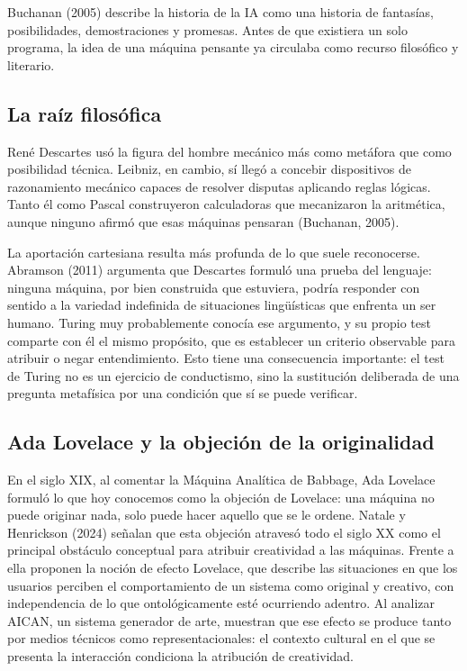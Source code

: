 \documentclass[12pt,letterpaper,oneside]{article}
\begin{document}
Buchanan (2005) describe la historia de la IA como una historia de fantasías, posibilidades, demostraciones y promesas. Antes de que existiera un solo programa, la idea de una máquina pensante ya circulaba como recurso filosófico y literario.

\subsection{La raíz filosófica}

René Descartes usó la figura del hombre mecánico más como metáfora que como posibilidad técnica. Leibniz, en cambio, sí llegó a concebir dispositivos de razonamiento mecánico capaces de resolver disputas aplicando reglas lógicas. Tanto él como Pascal construyeron calculadoras que mecanizaron la aritmética, aunque ninguno afirmó que esas máquinas pensaran (Buchanan, 2005).

La aportación cartesiana resulta más profunda de lo que suele reconocerse. Abramson (2011) argumenta que Descartes formuló una prueba del lenguaje: ninguna máquina, por bien construida que estuviera, podría responder con sentido a la variedad indefinida de situaciones lingüísticas que enfrenta un ser humano. Turing muy probablemente conocía ese argumento, y su propio test comparte con él el mismo propósito, que es establecer un criterio observable para atribuir o negar entendimiento. Esto tiene una consecuencia importante: el test de Turing no es un ejercicio de conductismo, sino la sustitución deliberada de una pregunta metafísica por una condición que sí se puede verificar.

\subsection{Ada Lovelace y la objeción de la originalidad}

En el siglo XIX, al comentar la Máquina Analítica de Babbage, Ada Lovelace formuló lo que hoy conocemos como la objeción de Lovelace: una máquina no puede originar nada, solo puede hacer aquello que se le ordene. Natale y Henrickson (2024) señalan que esta objeción atravesó todo el siglo XX como el principal obstáculo conceptual para atribuir creatividad a las máquinas. Frente a ella proponen la noción de efecto Lovelace, que describe las situaciones en que los usuarios perciben el comportamiento de un sistema como original y creativo, con independencia de lo que ontológicamente esté ocurriendo adentro. Al analizar AICAN, un sistema generador de arte, muestran que ese efecto se produce tanto por medios técnicos como representacionales: el contexto cultural en el que se presenta la interacción condiciona la atribución de creatividad.
\end{document}
